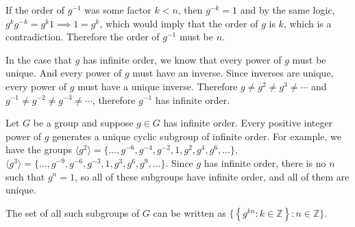 \documentclass[a4paper]{article}
\begin{document}
If the order of $g^{-1}$ was some factor $k < n$, then $g^{-k} = 1$ and by the same logic, $g^k g^{-k} = g^k 1 \implies 1 = g^k$, which would imply that the order of $g$ is $k$, which is a contradiction. Therefore the order of $g^{-1}$ must be $n$.

In the case that $g$ has infinite order, we know that every power of $g$ must be unique. And every power of $g$ must have an inverse. Since inverses are unique, every power of $g$ must have a unique inverse. Therefore $g \ne g^2 \ne g^3 \ne \cdots$ and $g^{-1} \ne g^{-2} \ne g^{-3} \ne \cdots$, therefore $g^{-1}$ has infinite order.


Let $G$ be a group and suppose $g \in G$ has infinite order. Every positive integer power of $g$ generates a unique cyclic subgroup of infinite order. For example, we have the groups $\langle g^2 \rangle = \{\ldots, g^{-6}, g^{-4}, g^{-2}, 1, g^2, g^4, g^6, \ldots\}$, $\langle g^3 \rangle = \{\ldots, g^{-9}, g^{-6}, g^{-3}, 1, g^3, g^6, g^9, \ldots\}$. Since $g$ has infinite order, there is no $n$ such that $g^n = 1$, so all of these subgroups have infinite order, and all of them are unique.

The set of all such subgroups of $G$ can be written as $\Big\{ \left\{g^{kn} : k \in \mathbb Z\right\} : n \in \mathbb Z \Big\}$.
\end{document}
